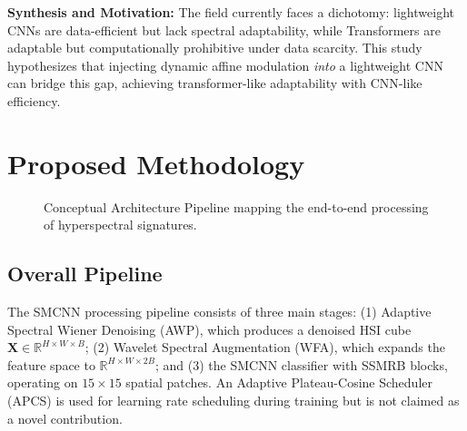 \documentclass[conference]{IEEEtran}
\begin{document}
{\textbf{Synthesis and Motivation:} The field currently faces a dichotomy: lightweight CNNs are data-efficient but lack spectral adaptability, while Transformers are adaptable but computationally prohibitive under data scarcity. This study hypothesizes that injecting dynamic affine modulation \textit{into} a lightweight CNN can bridge this gap, achieving transformer-like adaptability with CNN-like efficiency.

\section{Proposed Methodology}

\begin{figure}[!t]
\centering
{}
\caption{Conceptual Architecture Pipeline mapping the end-to-end processing of hyperspectral signatures.}
\label{fig:conceptual_pipeline}
\end{figure}


\subsection{Overall Pipeline}

The SMCNN processing pipeline consists of three main stages: (1) Adaptive Spectral Wiener Denoising (AWP), which produces a denoised HSI cube $\mathbf{X} \in \mathbb{R}^{H \times W \times B}$; (2) Wavelet Spectral Augmentation (WFA), which expands the feature space to $\mathbb{R}^{H \times W \times 2B}$; and (3) the SMCNN classifier with SSMRB blocks, operating on $15 \times 15$ spatial patches. An Adaptive Plateau-Cosine Scheduler (APCS) is used for learning rate scheduling during training but is not claimed as a novel contribution.

}
\end{document}
